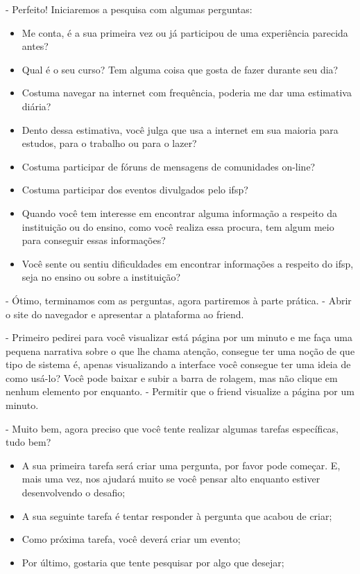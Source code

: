 - Perfeito! Iniciaremos a pesquisa com algumas perguntas: 
\begin{itemize}
    \item Me conta, é a sua primeira vez ou já participou de uma experiência parecida antes?
    \item Qual é o seu curso? Tem alguma coisa que gosta de fazer durante seu dia?
    \item Costuma navegar na internet com frequência, poderia me dar uma estimativa diária?
    \item Dento dessa estimativa, você julga que usa a internet em sua maioria para estudos, para o trabalho ou para o lazer? 
    \item Costuma participar de fóruns de mensagens de comunidades on-line?
    \item Costuma participar dos eventos divulgados pelo \acs{ifsp}?
    \item Quando você tem interesse em encontrar alguma informação a respeito da instituição ou do ensino, como você realiza essa procura, tem algum meio para conseguir essas informações? 
    \item Você sente ou sentiu dificuldades em encontrar informações a respeito do \acs{ifsp}, seja no ensino ou sobre a instituição?
\end{itemize}

- Ótimo, terminamos com as perguntas, agora partiremos à parte prática. - Abrir o site do navegador e apresentar a plataforma ao \gls{friend}. 

- Primeiro pedirei para você visualizar está página por um minuto e me faça uma pequena narrativa sobre o que lhe chama atenção, consegue ter uma noção de que tipo de sistema é, apenas visualizando a interface você consegue ter uma ideia de como usá-lo? Você pode baixar e subir a barra de rolagem, mas não clique em nenhum elemento por enquanto. - Permitir que o \gls{friend} visualize a página por um minuto.  

- Muito bem, agora preciso que você tente realizar algumas tarefas específicas, tudo bem?
\begin{itemize}
    \item A sua primeira tarefa será criar uma pergunta, por favor pode começar. E, mais uma vez, nos ajudará muito se você pensar alto enquanto estiver desenvolvendo o desafio;
    \item A sua seguinte tarefa é tentar responder à pergunta que acabou de criar;
    \item Como próxima tarefa, você deverá criar um evento;
    \item Por último, gostaria que tente pesquisar por algo que desejar; 
\end{itemize}

